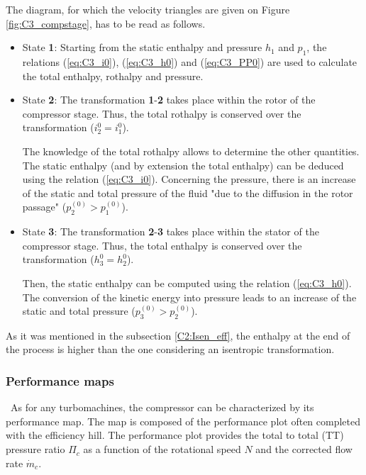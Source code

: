 The diagram, for which the velocity triangles are given on Figure \ref{fig:C3_compstage}, has to be read as follows.
\begin{itemize}
\item State \textbf{1}: Starting from the static enthalpy and pressure $h_1$ and $p_1$, the relations (\ref{eq:C3_i0}), (\ref{eq:C3_h0}) and (\ref{eq:C3_PP0}) are used to calculate the total enthalpy, rothalpy and pressure.  
\item State \textbf{2}: The transformation \textbf{1}-\textbf{2} takes place within the rotor of the compressor stage. Thus, the total rothalpy is conserved over the transformation ($i_2^0=i_1^0$). 

The knowledge of the total rothalpy allows to determine the other quantities. The static enthalpy (and by extension the total enthalpy) can be deduced using the relation (\ref{eq:C3_i0}). Concerning the pressure, there is an increase of the static and total pressure of the fluid "due to the diffusion in the rotor passage"\citep{Hillewaert2019} ($p_2^{(0)} > p_1^{(0)}$).
 
\item State \textbf{3}: The transformation \textbf{2}-\textbf{3} takes place within the stator of the compressor stage. Thus, the total enthalpy is conserved over the transformation ($h_3^0 = h_2^0$).

Then, the static enthalpy can be computed using the relation (\ref{eq:C3_h0}). The conversion of the kinetic energy into pressure leads to an increase of the static and total pressure ($p_3^{(0)} > p_2^{(0)}$).
\end{itemize}
As it was mentioned in the subsection \ref{C2:Isen_eff}, the enthalpy at the end of the process is higher than the one considering an isentropic transformation.
\subsubsection{Performance maps}
\quad\, As for any turbomachines, the compressor can be characterized by its performance map. The map is composed of the performance plot often completed with the efficiency hill. The performance plot provides the total to total (TT) pressure ratio $\Pi_c$ as a function of the rotational speed $N$ and the corrected flow rate $\dot{m}_c$.

